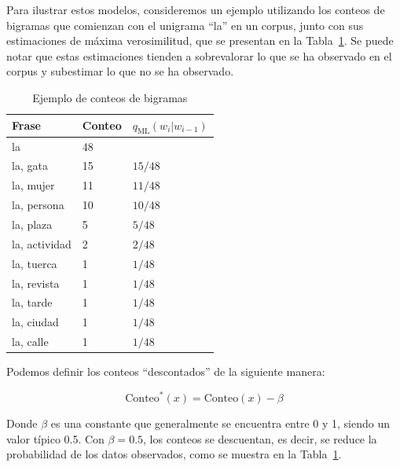 Para ilustrar estos modelos, consideremos un ejemplo utilizando los conteos de bigramas que comienzan con el unigrama ``la'' en un corpus, junto con sus estimaciones de máxima verosimilitud, que se presentan en la Tabla~\ref{tab:plm_ej}. Se puede notar que estas estimaciones tienden a sobrevalorar lo que se ha observado en el corpus y subestimar lo que no se ha observado.

\begin{table}[h]
    \centering
    \begin{tabular}{|l|l|l|}\hline
        \textbf{Frase} & \textbf{Conteo} & \textbf{$q_{\text{ML}}(w_i | w_{i-1})$} \\
        \hline
        la & 48 & \\
        la, gata & 15 & $15/48$ \\
        la, mujer & 11 & $11/48$ \\
        la, persona & 10 & $10/48$ \\
        la, plaza & 5 & $5/48$ \\
        la, actividad & 2 & $2/48$ \\
        la, tuerca & 1 & $1/48$ \\
        la, revista & 1 & $1/48$ \\
        la, tarde & 1 & $1/48$ \\
        la, ciudad & 1 & $1/48$ \\
        la, calle & 1 & $1/48$ \\ \hline
    \end{tabular}\caption{Ejemplo de conteos de bigramas}\label{tab:plm_ej}
\end{table}

Podemos definir los conteos ``descontados'' de la siguiente manera:

\[
\text{Conteo}^*(x) = \text{Conteo}(x) - \beta
\]

Donde $\beta$ es una constante que generalmente se encuentra entre 0 y 1, siendo un valor típico 0.5. Con $\beta=0.5$, los conteos se descuentan, es decir, se reduce la probabilidad de los datos observados, como se muestra en la Tabla~\ref{tab:plm_ej}.

